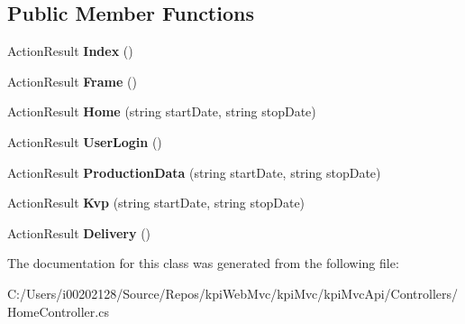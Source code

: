\subsection*{Public Member Functions}
\begin{DoxyCompactItemize}
\item 
\mbox{\label{classkpi_mvc_api_1_1_controllers_1_1_home_controller_a10e3c3151fdc896f23d1ed374bdcd6cf}} 
Action\+Result {\bfseries Index} ()
\item 
\mbox{\label{classkpi_mvc_api_1_1_controllers_1_1_home_controller_a8fe51f06ec9db44e1766f89691af44f6}} 
Action\+Result {\bfseries Frame} ()
\item 
\mbox{\label{classkpi_mvc_api_1_1_controllers_1_1_home_controller_a136db913ab3394130e98d9e9376f2be9}} 
Action\+Result {\bfseries Home} (string start\+Date, string stop\+Date)
\item 
\mbox{\label{classkpi_mvc_api_1_1_controllers_1_1_home_controller_a52ba84d65a16f3ec9f7c18ef46313b23}} 
Action\+Result {\bfseries User\+Login} ()
\item 
\mbox{\label{classkpi_mvc_api_1_1_controllers_1_1_home_controller_ae5c2fcc4413eda2cab2775cd9819efca}} 
Action\+Result {\bfseries Production\+Data} (string start\+Date, string stop\+Date)
\item 
\mbox{\label{classkpi_mvc_api_1_1_controllers_1_1_home_controller_aab951608121b90d9424bb58c68bd0b23}} 
Action\+Result {\bfseries Kvp} (string start\+Date, string stop\+Date)
\item 
\mbox{\label{classkpi_mvc_api_1_1_controllers_1_1_home_controller_ac2b20012bdd1fec14e7db3aec9e05bf0}} 
Action\+Result {\bfseries Delivery} ()
\end{DoxyCompactItemize}


The documentation for this class was generated from the following file\+:\begin{DoxyCompactItemize}
\item 
C\+:/\+Users/i00202128/\+Source/\+Repos/kpi\+Web\+Mvc/kpi\+Mvc/kpi\+Mvc\+Api/\+Controllers/Home\+Controller.\+cs\end{DoxyCompactItemize}
